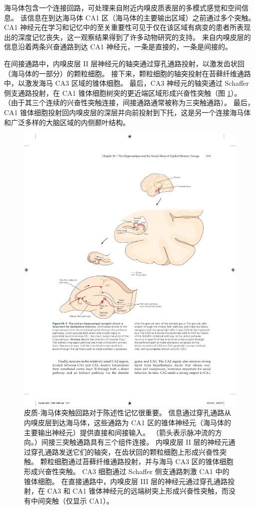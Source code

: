 海马体包含一个连接回路，可处理来自附近内嗅皮质表层的多模式感觉和空间信息。
该信息在到达海马体 CA1 区（海马体的主要输出区域）之前通过多个突触。
CA1 神经元在学习和记忆中的至关重要性可见于仅在该区域有病变的患者所表现出的深度记忆丧失，这一观察结果得到了许多动物研究的支持。
来自内嗅皮层的信息沿着两条兴奋通路到达 CA1 神经元，一条是直接的，一条是间接的。


在间接通路中，内嗅皮层 II 层神经元的轴突通过穿孔通路投射，以激发齿状回（海马体的一部分）的颗粒细胞。
接下来，颗粒细胞的轴突投射在苔藓纤维通路中，以激发海马 CA3 区域的锥体细胞。
最后，CA3 神经元的轴突通过 Schaffer 侧支通路投射，在 CA1 锥体细胞树突的更近端区域形成兴奋性突触（图 \ref{fig:54_1}）。
（由于其三个连续的兴奋性突触连接，间接通路通常被称为三突触通路）。
最后，CA1 锥体细胞投射回内嗅皮层的深层并向前投射到下托，这是另一个连接海马体和广泛多样的大脑区域的内侧颞叶结构。


\begin{figure}[htbp]
	\centering
	\includegraphics[width=0.9\linewidth]{chap54/fig_54_1}
	\caption{皮质-海马体突触回路对于陈述性记忆很重要。 信息通过穿孔通路从内嗅皮层到达海马体，这些通路为 CA1 区的锥体神经元（海马体的主要输出神经元）提供直接和间接输入。 （箭头表示脉冲流的方向。）间接三突触通路具有三个组件连接。 内嗅皮层 II 层的神经元通过穿孔通路发送它们的轴突，在齿状回的颗粒细胞上形成兴奋性突触。 颗粒细胞通过苔藓纤维通路投射，并与海马 CA3 区的锥体细胞形成兴奋性突触。 CA3 细胞通过 Schaffer 侧支通路刺激 CA1 中的锥体细胞。 在直接通路中，内嗅皮层 III 层的神经元通过穿孔通路投射，在 CA3 和 CA1 锥体神经元的远端树突上形成兴奋性突触，而没有中间突触（仅显示 CA1）。}
	\label{fig:54_1}
\end{figure}


